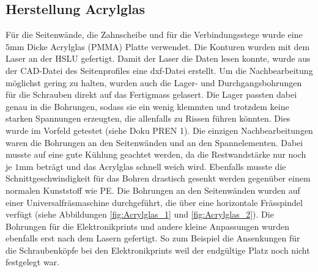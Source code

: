     \subsection{Herstellung Acrylglas}
		Für die Seitenwände, die Zahnscheibe und für die Verbindungsstege wurde eine 
		$5\si{\milli\meter}$ Dicke Acrylglas (PMMA) Platte verwendet. Die Konturen 
		wurden mit dem Laser an der HSLU gefertigt. Damit der Laser die Daten lesen 
		konnte, wurde aus der CAD-Datei des Seitenprofiles eine dxf-Datei erstellt. Um die Nachbearbeitung 
		möglichst gering zu halten, wurden auch die Lager- und Durchgangsbohrungen 
		für die Schrauben direkt auf das Fertigmass gelasert. Die Lager passten dabei 
		genau in die Bohrungen, sodass sie ein wenig klemmten und trotzdem keine 
		starken Spannungen erzeugten, die allenfalls zu Rissen führen könnten. Dies 
		wurde im Vorfeld getestet (siehe Doku PREN 1). Die einzigen Nachbearbeitungen 
		waren die Bohrungen an den Seitenwänden und an den Spannelementen. 
		Dabei musste auf eine gute Kühlung geachtet werden, da die Restwandstärke nur 
		noch je $1\si{\milli\meter}$ beträgt und das Acrylglas schnell weich wird. 
		Ebenfalls musste die Schnittgeschwindigkeit für das Bohren drastisch gesenkt 
		werden gegenüber einem normalen Kunststoff wie PE. Die Bohrungen an 
		den Seitenwänden wurden auf einer Universalfräsmaschine durchgeführt, die über eine 
		horizontale Frässpindel verfügt (siehe Abbildungen \ref{fig:Acrylglas_1} und 
		\ref{fig:Acrylglas_2}). Die Bohrungen für die 
		Elektronikprints und andere kleine Anpassungen wurden ebenfalls erst nach dem 
		Lasern gefertigt. So zum Beispiel die Ansenkungen für die Schraubenköpfe bei 
		den Elektronikprints weil der endgültige Platz noch nicht festgelegt war.
